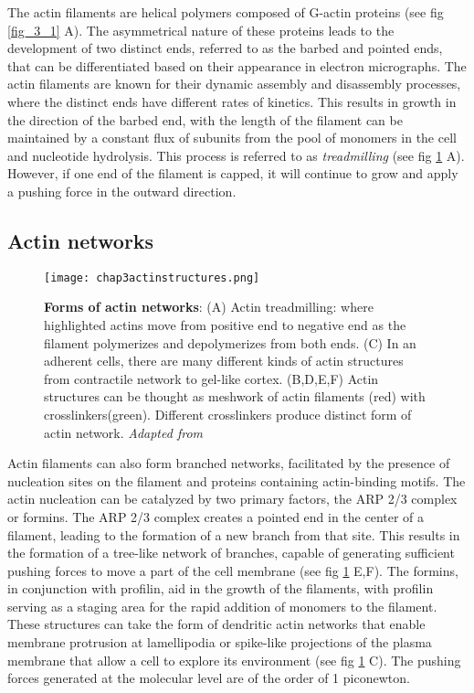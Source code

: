 The actin filaments are helical polymers composed of G-actin proteins (see fig \ref{fig_3_1} A).
The asymmetrical nature of these proteins leads to the development of two distinct ends, referred to as the barbed and pointed ends, that can be differentiated based on their appearance in electron micrographs. The actin filaments are known for their dynamic assembly and disassembly processes, where the distinct ends have different rates of kinetics. This results in growth in the direction of the barbed end, with the length of the filament can be maintained by a constant flux of subunits from the pool of monomers in the cell and nucleotide hydrolysis. This process is referred to as \textit{treadmilling} (see fig \ref{fig_3_2} A). However, if one end of the filament is capped, it will continue to grow and apply a pushing force in the outward direction.


\hypertarget{actin-networks}{%
	\subsection{Actin networks}\label{actin-networks}}

\begin{figure}[H]
	\centering
	\texttt{[image: chap3actinstructures.png]}
	\caption{\label{fig_3_2} \textbf{Forms of actin networks}: (A) Actin treadmilling: where highlighted actins move from positive end to negative end as the filament polymerizes and depolymerizes from both ends. (C) In an adherent cells, there are many different kinds of actin structures from contractile network to gel-like cortex. (B,D,E,F) Actin structures can be thought as meshwork of actin filaments (red) with crosslinkers(green). Different crosslinkers produce distinct form of actin network.  \textit{Adapted from \cite{alberts2015}}
	}
\end{figure}

Actin filaments can also form branched networks, facilitated by the presence of nucleation sites on the filament and proteins containing actin-binding motifs. The actin nucleation can be catalyzed by two primary factors, the ARP 2/3 complex or formins. The ARP 2/3 complex creates a pointed end in the center of a filament, leading to the formation of a new branch from that site. This results in the formation of a tree-like network of branches, capable of generating sufficient pushing forces to move a part of the cell membrane (see fig \ref{fig_3_2} E,F). The formins, in conjunction with profilin, aid in the growth of the filaments, with profilin serving as a staging area for the rapid addition of monomers to the filament. These structures can take the form of dendritic actin networks that enable membrane protrusion at lamellipodia or spike-like projections of the plasma membrane that allow a cell to explore its environment (see fig \ref{fig_3_2} C). The pushing forces generated at the molecular level are of the order of 1 piconewton.


